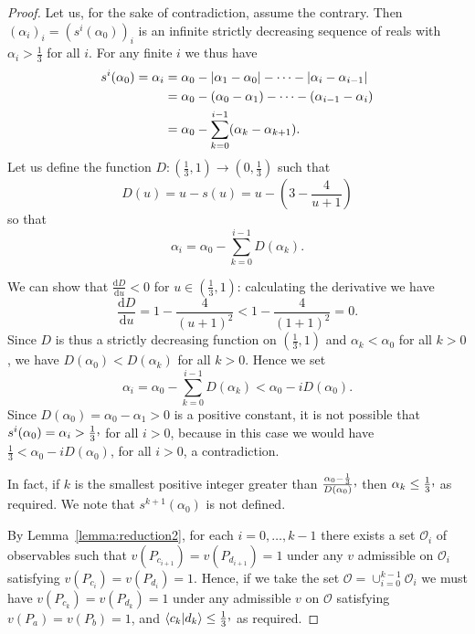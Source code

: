 \documentclass[%
 superscriptaddress,
 preprint,
 showpacs,
 showkeys,
 nofootinbib,
  amsmath,amssymb,
  aps,
  longbibliography,
  floatfix,
 ]{revtex4-1}
\theoremstyle{definition}
\newcommand{\dd}{\mathrm{d}}
\newcommand{\iprod}[2]{\langle #1 | #2 \rangle}
\begin{document}
\begin{proof}
	Let us, for the sake of contradiction, assume the contrary.
	Then $(\alpha_i)_i=(s^i(\alpha_0))_i$ is an infinite strictly decreasing sequence of reals with $\alpha_i>\frac{1}{3}$ for all $i$.
	For any finite $i$ we thus have
	\begin{align*}
		s^i(\alpha_0)=\alpha_i &= \alpha_0 - |\alpha_1 - \alpha_0| - \cdots - |\alpha_i - \alpha_{i-1}|\notag\\
		&= \alpha_0 - (\alpha_0 - \alpha_1) - \cdots - (\alpha_{i-1}-\alpha_i)\notag\\
		&= \alpha_0 - \sum_{k=0}^{i-1}(\alpha_k - \alpha_{k+1}).		
	\end{align*}
	Let us define the function $D:\left(\frac{1}{3},1\right)\to \left(0,\frac{1}{3}\right)$ such that $$D(u) = u - s(u) = u - \left(3-\frac{4}{u+1}\right)$$ so that
	$$
		\alpha_i = \alpha_0 - \sum_{k=0}^{i-1}D(\alpha_k).
	$$
	
	
	We can show that $\frac{\dd D}{\dd u} < 0$ for $u\in\left(\frac{1}{3},1\right)$: calculating the derivative we have
		$$\frac{\dd D}{\dd u} = 1 - \frac{4}{(u+1)^2}
			< 1 - \frac{4}{(1+1)^2}= 0.$$
	Since $D$ is thus a strictly decreasing function
	on $\left(\frac{1}{3},1\right)$ and $\alpha_k<\alpha_0$ for all $k>0$,
	we have $D(\alpha_0)< D(\alpha_k)$ for all $k>0$.
	Hence we set
	$$\alpha_i = \alpha_0 - \sum_{k=0}^{i-1}D(\alpha_k) < \alpha_0 - iD(\alpha_0).$$
	Since $D(\alpha_0)=\alpha_0 - \alpha_1 > 0$ is a positive constant, it is not possible that $s^i(\alpha_0) = \alpha_i > \frac{1}{3}\raisebox{.8mm}{,}$ for all $i>0$, because in this case we would have $\frac{1}{3} < \alpha_{0}-iD(\alpha_{0})$, for all $i>0$, a contradiction.
	
	
	In fact, if $k$ is the smallest positive integer greater than $\frac{\alpha_{0}-\frac{1}{3}}  {D(\alpha_{0})}\raisebox{.8mm}{,}$ then $\alpha_k\le   \frac{1}{3}\raisebox{.8mm}{,}$ as required.
	We note that $s^{k+1}(\alpha_0)$ is not defined.
	
	By Lemma~\ref{lemma:reduction2}, for each $i=0,\dots,k-1$ there exists a set $\mathcal{O}_i$ of observables such that $v(P_{c_{i+1}})=v(P_{d_{i+1}})=1$ under any $v$ admissible on $\mathcal{O}_i$ satisfying $v(P_{c_i})=v(P_{d_i})=1$.
	Hence, if we take the set $\mathcal{O}=\cup_{i=0}^{k-1}\mathcal{O}_i$ we must have $v(P_{c_k})=v(P_{d_k})=1$ under any admissible $v$ on $\mathcal{O}$ satisfying $v(P_a)=v(P_b)=1$, and $\iprod{c_k}{d_k}\le \frac{1}{3}\raisebox{.8mm}{,}$ as required.
\end{proof}
\end{document}
